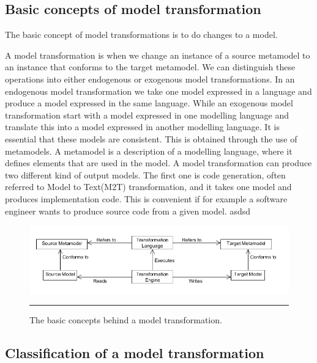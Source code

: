 \subsection{Basic concepts of model transformation}

The basic concept of model transformations is to do changes to a model. 

A model transformation is when we change an instance of a source metamodel to an
instance that conforms to the target metamodel. We can distinguish these operations into either endogenous or exogenous model transformations. In an
endogenous model transformation we take one model expressed in a language and
produce a model expressed in the same language.
While an exogenous model transformation start with a model expressed in one
modelling language and translate this into a model expressed in another
modelling language. It is essential that these models are consistent. This is
obtained through the use of metamodels. A metamodel is a description of a
modelling language, where it defines elements that are used in the model.
A model transformation can produce two different kind of output models. The
first one is code generation, often referred to Model to Text(M2T)
transformation, and it takes one model and produces implementation code. This
is convenient if for example a software engineer wants to produce source code
from a given model. asdsd
\begin{figure}[H]
  \centering
    \includegraphics[scale=0.5]{./Figures/BasicTransformation.png}
    \rule{35em}{0.5pt}
  \caption[Basic Model Transformation]
  				{The basic concepts behind a model
  transformation.}
  \label{fig:BasicTransformation}
\end{figure}


\subsection{Classification of a model transformation}

